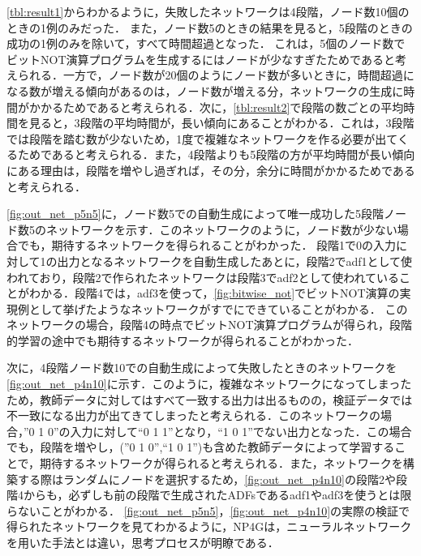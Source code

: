 \documentclass[exploratorypaper]{jsaiart} %
\begin{document}
\ref{tbl:result1}からわかるように，失敗したネットワークは4段階，ノード数10個のときの1例のみだった．
また，ノード数5のときの結果を見ると，5段階のときの成功の1例のみを除いて，すべて時間超過となった．
これは，5個のノード数でビットNOT演算プログラムを生成するにはノードが少なすぎたためであると考えられる．一方で，ノード数が20個のようにノード数が多いときに，時間超過になる数が増える傾向があるのは，ノード数が増える分，ネットワークの生成に時間がかかるためであると考えられる．次に，\ref{tbl:result2}で段階の数ごとの平均時間を見ると，3段階の平均時間が，長い傾向にあることがわかる．これは，3段階では段階を踏む数が少ないため，1度で複雑なネットワークを作る必要が出てくるためであると考えられる．また，4段階よりも5段階の方が平均時間が長い傾向にある理由は，段階を増やし過ぎれば，その分，余分に時間がかかるためであると考えられる．

\ref{fig:out_net_p5n5}に，ノード数5での自動生成によって唯一成功した5段階ノード数5のネットワークを示す．このネットワークのように，ノード数が少ない場合でも，期待するネットワークを得られることがわかった．
段階1で0の入力に対して1の出力となるネットワークを自動生成したあとに，段階2でadf1として使われており，段階2で作られたネットワークは段階3でadf2として使われていることがわかる．段階4では，adf3を使って，\ref{fig:bitwise_not}でビットNOT演算の実現例として挙げたようなネットワークがすでにできていることがわかる．
このネットワークの場合，段階4の時点でビットNOT演算プログラムが得られ，段階的学習の途中でも期待するネットワークが得られることがわかった．

次に，4段階ノード数10での自動生成によって失敗したときのネットワークを\ref{fig:out_net_p4n10}に示す．このように，複雑なネットワークになってしまったため，教師データに対してはすべて一致する出力は出るものの，検証データでは不一致になる出力が出てきてしまったと考えられる．このネットワークの場合，”0 1 0”の入力に対して“0 1 1”となり，“1 0 1”でない出力となった．この場合でも，段階を増やし，(”0 1 0”,“1 0 1”)も含めた教師データによって学習することで，期待するネットワークが得られると考えられる．また，ネットワークを構築する際はランダムにノードを選択するため，\ref{fig:out_net_p4n10}の段階2や段階4からも，必ずしも前の段階で生成されたADFsであるadf1やadf3を使うとは限らないことがわかる．
\ref{fig:out_net_p5n5}，\ref{fig:out_net_p4n10}の実際の検証で得られたネットワークを見てわかるように，NP4Gは，ニューラルネットワークを用いた手法とは違い，思考プロセスが明瞭である．
\end{document}
